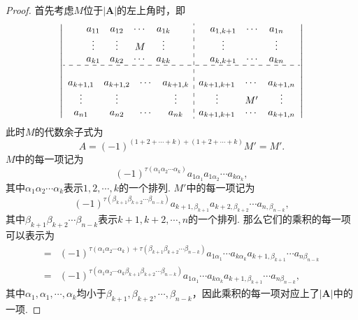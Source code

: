 \documentclass{article}
\newcommand{\mbf}[1]{\bm{#1}}
\begin{document}
\begin{proof}
首先考虑$M$位于$|\mbf{A}|$的左上角时，即
$$
\left|
\begin{array}{c:c}
\begin{matrix}
a_{11} & a_{12} & \cdots & a_{1k} \\
\vdots & \vdots & M & \vdots \\
a_{k1} & a_{k2} & \cdots & a_{kk} 
\end{matrix} &
\begin{matrix}
a_{1,k+1} & \cdots  & a_{1n} \\ 
\vdots &  & \vdots \\
a_{k,k+1} &  \cdots & a_{kn} 
\end{matrix} \\
\hdashline \\
\begin{matrix}
a_{k+1,1} & a_{k+1,2} & \cdots & a_{k+1,k} \\
\vdots & \vdots &  & \vdots \\
a_{n1} & a_{n2} & \cdots & a_{nk} 
\end{matrix} &
\begin{matrix}
a_{k+1,k+1} & \cdots  & a_{k+1,n} \\ 
\vdots & M' & \vdots \\
a_{k+1,k+1} &  \cdots & a_{k+1,n} 
\end{matrix} \\
\end{array} \right|
$$
此时$M$的代数余子式为
$$
A = (-1)^{(1+2+\cdots+k) + (1+2+\cdots+k)}M' = M'.
$$
$M$中的每一项记为
$$
(-1)^{\tau(\alpha_1\alpha_2\cdots\alpha_k)}a_{1\alpha_1}a_{1\alpha_2}\cdots a_{k\alpha_k},
$$
其中$\alpha_1\alpha_2\cdots\alpha_k$表示$1,2,\cdots,k$的一个排列.
$M'$中的每一项记为
$$
(-1)^{\tau(\beta_{k+1}\beta_{k+2}\cdots\beta_{n-k})}a_{k+1,\beta_{k+1}}a_{k+2,\beta_{k+2}}\cdots a_{n,\beta_{n-k}},
$$
其中$\beta_{k+1}\beta_{k+2}\cdots\beta_{n-k}$表示$k+1,k+2,\cdots,n$的一个排列. 那么它们的乘积的每一项可以表示为
$$
\begin{array}{ll}
=&(-1)^{\tau(\alpha_1\alpha_2\cdots\alpha_k) + \tau(\beta_{k+1}\beta_{k+2}\cdots\beta_{n-k})} a_{1\alpha_1}\cdots a_{k\alpha_k}a_{k+1,\beta_{k+1}}\cdots a_{n\beta_{n-k}} \\
=&(-1)^{\tau(\alpha_1\alpha_2\cdots\alpha_k\beta_{k+1}\beta_{k+2}\cdots\beta_{n-k})} a_{1\alpha_1}\cdots a_{k\alpha_k}a_{k+1,\beta_{k+1}}\cdots a_{n\beta_{n-k}},
\end{array}
$$
其中$\alpha_1,\alpha_1,\cdots,\alpha_k$均小于$\beta_{k+1},\beta_{k+2},\cdots,\beta_{n-k}$，因此乘积的每一项对应上了$|\mbf{A}|$中的一项. 


\end{proof}
\end{document}
